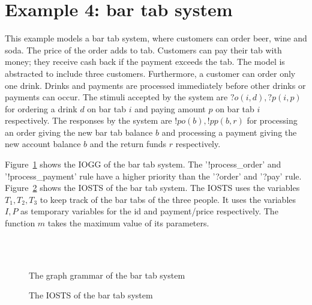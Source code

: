 \section{Example 4: bar tab system}
This example models a bar tab system, where customers can order beer, wine and soda. The price of the order adds to tab. Customers can pay their tab with money; they receive cash back if the payment exceeds the tab. The model is abstracted to include three customers. Furthermore, a customer can order only one drink. Drinks and payments are processed immediately before other drinks or payments can occur. The stimuli accepted by the system are $?o(i,d), ?p(i,p)$ for ordering a drink $d$ on bar tab $i$ and paying amount $p$ on bar tab $i$ respectively. The responses by the system are $!po(b), !pp(b,r)$ for processing an order giving the new bar tab balance $b$ and processing a payment giving the new account balance $b$ and the return funds $r$ respectively.

Figure~\ref{fig:gg-bartab} shows the IOGG of the bar tab system. The '!process\_order' and '!process\_payment' rule have a higher priority than the '?order' and '?pay' rule. Figure~\ref{fig:sts-bartab} shows the IOSTS of the bar tab system. The IOSTS uses the variables $T_1, T_2, T_3$ to keep track of the bar tabs of the three people. It uses the variables $I, P$ as temporary variables for the id and payment/price respectively. The function $m$ takes the maximum value of its parameters.

\begin{figure}[ht]
  \begin{center}
    \\
    \hspace{20px}
    \\
    \hspace{20px}
  \end{center}
  \caption{The graph grammar of the bar tab system}
  \label{fig:gg-bartab}
\end{figure}

\begin{figure}[ht]
  \begin{center}
    
  \end{center}
  \caption{The IOSTS of the bar tab system}
  \label{fig:sts-bartab}
\end{figure}


